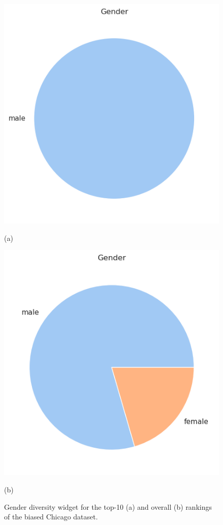 \begin{itemize}
\begin{itemize}
\begin{figure}[t!]
\centering
\begin{minipage}{0.45\textwidth}
\centering
\includegraphics[width=\textwidth]{figures/chicago_biased_rankingfacts1a.png}
\caption*{(a)}
\end{minipage}
\begin{minipage}{0.45\textwidth}
\centering
\includegraphics[width=\textwidth]{figures/chicago_biased_rankingfacts1b.png}
\caption*{(b)}
\end{minipage}
\caption{\textrm{Gender} diversity widget for the top-10 (a) and overall (b) rankings of the biased Chicago dataset.}
\label{fig:chicago_biased_rankingfacts}
\end{figure}


\end{itemize}
\end{itemize}
